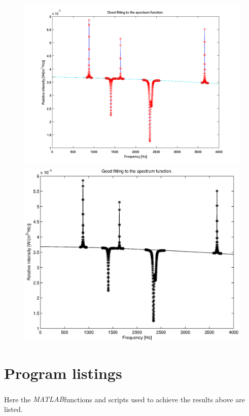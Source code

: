 \documentclass[10pt, a4paper]{article}
\newcommand{\matlab}{\small{\emph{MATLAB\textsuperscript{\textregistered}}}}
\begin{document}
\begin{figure}[hbt]
\begin{center}
\ifpdf
	\includegraphics[width=\linewidth]{../img/spectrum_goodfit.png}
\else
	\includegraphics[width=\linewidth]{../img/spectrum_goodfit.eps}
\fi
\end{center}
\caption{}
\label{fig:goodfit}
\end{figure}




\clearpage

\section{Program listings} \label{appendix:programs}
Here the \matlab functions and scripts used to achieve the results above are listed.
\end{document}
